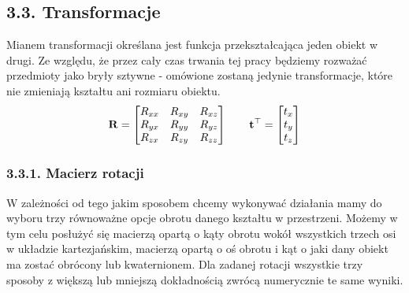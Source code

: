 \documentclass{article}
\begin{document}
\subsection*{\LARGE{3.3. Transformacje}} 

Mianem transformacji określana jest funkcja przekształcająca jeden obiekt w drugi. Ze względu, że przez cały czas trwania tej pracy będziemy rozważać przedmioty jako bryły sztywne - omówione zostaną jedynie transformacje, które nie zmieniają kształtu ani rozmiaru obiektu. 
\[
\mathbf{R} = \begin{bmatrix}
R_{xx} & R_{xy} & R_{xz} \\
R_{yx} & R_{yy} & R_{yz} \\
R_{zx} & R_{zy} & R_{zz}
\end{bmatrix}
\qquad
\vb{t}^\top = \begin{bmatrix}
t_{x} \\ t_{y} \\ t_{z}
\end{bmatrix}
\]

\subsubsection*{\Large{3.3.1. Macierz rotacji}}
W zależności od tego jakim sposobem chcemy wykonywać działania mamy do wyboru trzy równoważne opcje obrotu danego kształtu w przestrzeni. Możemy w tym celu posłużyć się macierzą opartą o kąty obrotu wokół wszystkich trzech osi w układzie kartezjańskim, macierzą opartą o oś obrotu i kąt o jaki dany obiekt ma zostać obrócony lub kwaternionem. Dla zadanej rotacji wszystkie trzy sposoby z większą lub mniejszą dokładnością zwrócą numerycznie te same wyniki.
\end{document}
